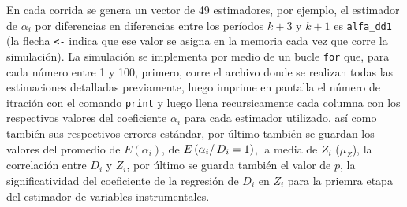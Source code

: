 \documentclass[]{article}
\begin{document}
En cada corrida se genera un vector de 49 estimadores, por ejemplo, el
estimador de $\alpha_{i}$ por diferencias en diferencias entre los
períodos $k+3$ y $k+1$ es \texttt{alfa\_dd1} (la flecha
\texttt{\textless{}-} indica que ese valor se asigna en la memoria cada
vez que corre la simulación). La simulación se implementa por medio de
un bucle \texttt{for} que, para cada número entre 1 y 100, primero,
corre el archivo donde se realizan todas las estimaciones detalladas
previamente, luego imprime en pantalla el número de itración con el
comando \texttt{print} y luego llena recursicamente cada columna con los
respectivos valores del coeficiente $\alpha_{i}$ para cada estimador
utilizado, así como también sus respectivos errores estándar, por último
también se guardan los valores del promedio de
$E\left(\alpha_{i}\right)$, de $E\left(\alpha_{i}\right/D_{i}=1)$, la
media de $Z_{i}$ ($\mu_{Z}$), la correlación entre $D_{i}$ y $Z_{i}$,
por último se guarda también el valor de $p$, la significatividad del
coeficiente de la regresión de $D_{i}$ en $Z_{i}$ para la priemra etapa
del estimador de variables instrumentales.
\end{document}
